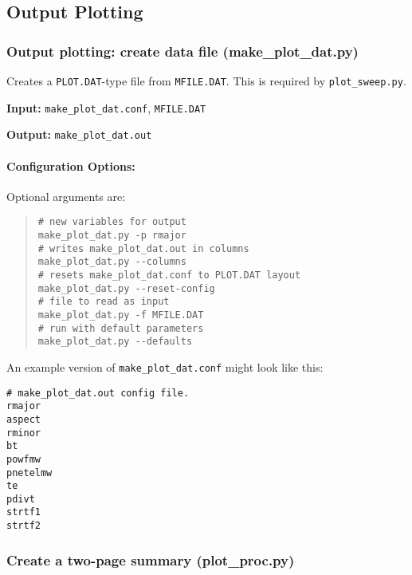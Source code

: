 \documentclass[11pt,a4paper]{article}
\newcommand{\mfile}{\mbox{\texttt{MFILE.DAT}}}
\newcommand{\plotdat}{\mbox{\texttt{PLOT.DAT}}}
\begin{document}
\subsection{Output Plotting}


\subsubsection{Output plotting: create data file (make\_plot\_dat.py)}

Creates a \plotdat-type file from \mfile.  This is required by \texttt{plot\_sweep.py}.

\begin{description}
\item{\textbf{Input:}}
\verb|make_plot_dat.conf|, \mfile\

\item{\textbf{Output:}}
\verb|make_plot_dat.out|
\end{description}

\paragraph{Configuration Options:}

Optional arguments are:
\begin{quote}
\begin{verbatim}
# new variables for output
make_plot_dat.py -p rmajor
# writes make_plot_dat.out in columns
make_plot_dat.py --columns
# resets make_plot_dat.conf to PLOT.DAT layout
make_plot_dat.py --reset-config
# file to read as input
make_plot_dat.py -f MFILE.DAT
# run with default parameters
make_plot_dat.py --defaults
\end{verbatim}
\end{quote}

An example version of \texttt{make\_plot\_dat.conf} might look like this:
\begin{framed}
\begin{verbatim}
# make_plot_dat.out config file.
rmajor
aspect
rminor
bt
powfmw
pnetelmw
te
pdivt
strtf1
strtf2
\end{verbatim}
\end{framed}


\subsubsection{Create a two-page summary (plot\_proc.py)}
\end{document}
